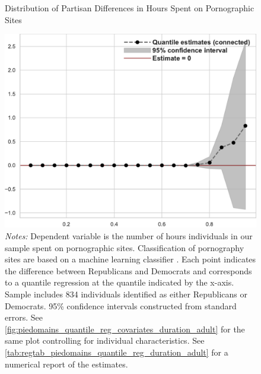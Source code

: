 \documentclass[12pt, letterpaper]{article}
\begin{document}
\begin{figure}[t]
	\centering
	\caption{Distribution of Partisan Differences in Hours Spent on Pornographic Sites}
	\includegraphics[width=.55\linewidth]{../figs/piedomains_quantile_reg_duration_adult.pdf}
	\caption*{\footnotesize \emph{Notes:} 
		Dependent variable is the number of hours individuals in our sample spent on pornographic sites.
		Classification of pornography sites are based on a machine learning classifier \citep{Chintalapati_piedomains_Predict_the_2022}.
		Each point indicates the difference between Republicans and Democrats and corresponds to a quantile regression at the quantile indicated by the x-axis.
		Sample includes 834 individuals identified as either Republicans or Democrats.
		95\% confidence intervals constructed from standard errors.
		See \cref{fig:piedomains_quantile_reg_covariates_duration_adult} for the same plot controlling for individual characteristics.
		See \cref{tab:regtab_piedomains_quantile_reg_duration_adult} for a numerical report of the estimates.
	}
	\label{fig:piedomains_quantile_reg_duration_adult}
\end{figure}
\end{document}
